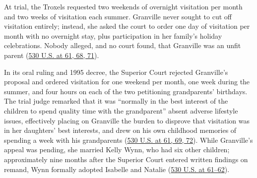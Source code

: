 \documentclass[12pt]{article}
\begin{document}
At trial, the Troxels requested two weekends of overnight visitation per month and two weeks of visitation each summer. Granville never sought to cut off visitation entirely; instead, she asked the court to order one day of visitation per month with no overnight stay, plus participation in her family's holiday celebrations. Nobody alleged, and no court found, that Granville was an unfit parent (\href{https://www.law.cornell.edu/supremecourt/text/99-138}{530 U.S. at 61, 68, 71}).

In its oral ruling and 1995 decree, the Superior Court rejected Granville's proposal and ordered visitation for one weekend per month, one week during the summer, and four hours on each of the two petitioning grandparents' birthdays. The trial judge remarked that it was ``normally in the best interest of the children to spend quality time with the grandparent'' absent adverse lifestyle issues, effectively placing on Granville the burden to disprove that visitation was in her daughters' best interests, and drew on his own childhood memories of spending a week with his grandparents (\href{https://www.law.cornell.edu/supremecourt/text/99-138}{530 U.S. at 61, 69, 72}). While Granville's appeal was pending, she married Kelly Wynn, who had six other children; approximately nine months after the Superior Court entered written findings on remand, Wynn formally adopted Isabelle and Natalie (\href{https://www.law.cornell.edu/supremecourt/text/99-138}{530 U.S. at 61--62}).
\end{document}
